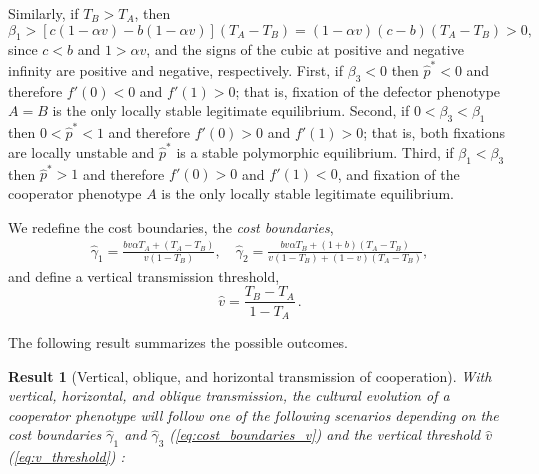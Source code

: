 \documentclass[12pt]{extarticle}
\newtheorem{result}{Result}
\begin{document}
{Similarly, if $T_B>T_A$, then
\begin{equation} \label{eq:beta1_rev}
   \beta_1 > [c(1-\alpha v) - b(1-\alpha v)] (T_A-T_B) 
   = (1-\alpha v)(c-b)(T_A-T_B) > 0,
 \end{equation}
since $c<b$ and $1>\alpha v$, and the signs of the cubic at positive and negative infinity are positive and negative, respectively. 
First, if $\beta_3<0$ then $\hat{p}^*<0$ and therefore $f'(0)<0$ and $f'(1)>0$; that is, fixation of the defector phenotype $A=B$ is the only locally stable legitimate equilibrium.
Second, if $0<\beta_3<\beta_1$ then $0<\hat{p}^*<1$ and therefore $f'(0)>0$ and $f'(1)>0$; that is, both fixations are locally unstable and $\hat{p}^*$ is a stable polymorphic equilibrium.
Third, if $\beta_1<\beta_3$ then $\hat{p}^*>1$ and therefore $f'(0)>0$ and $f'(1)<0$, and fixation of the cooperator phenotype $A$ is the only locally stable legitimate equilibrium.

We redefine the cost boundaries,
the \emph{cost boundaries},
\begin{equation} \label{eq:cost_boundaries_v}
\begin{aligned}
\hat\gamma_1 = \frac{b v \alpha T_A + (T_A - T_B)}{v(1-T_B)}, \quad
\hat\gamma_2 = \frac{b v \alpha T_B + (1+b) (T_A - T_B)}{v(1-T_B) + (1-v)(T_A-T_B)},
\end{aligned}
\end{equation}
and define a vertical transmission threshold,
\begin{equation} \label{eq:v_threshold}
\hat v = \frac{T_B - T_A}{1-T_A} \,.
\end{equation}

The following result summarizes the possible outcomes.
\\

\begin{result}[Vertical, oblique, and horizontal transmission of cooperation] \label{result:vert_obli_hori}
With vertical, horizontal, and oblique transmission, the cultural evolution of a cooperator phenotype will follow one of the following scenarios depending on the cost boundaries $\hat\gamma_1$ and $\hat\gamma_3$ (\autoref{eq:cost_boundaries_v}) and the vertical threshold $\hat v$ (\autoref{eq:v_threshold}) :



\end{result}}
\end{document}

